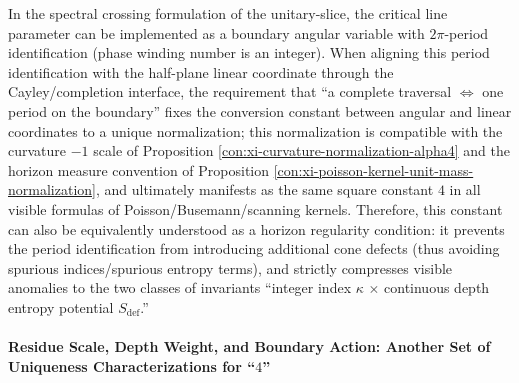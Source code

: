 \begin{proposition}\label{con:xi-four_as_horizon_regularization_no_cone}
In the spectral crossing formulation of the unitary-slice, the critical line parameter can be implemented as a boundary angular variable with \(2\pi\)-period identification (phase winding number is an integer).
When aligning this period identification with the half-plane linear coordinate through the Cayley/completion interface, the requirement that ``a complete traversal \(\Longleftrightarrow\) one period on the boundary'' fixes the conversion constant between angular and linear coordinates to a unique normalization; this normalization is compatible with the curvature \(-1\) scale of Proposition \ref{con:xi-curvature-normalization-alpha4} and the horizon measure convention of Proposition \ref{con:xi-poisson-kernel-unit-mass-normalization}, and ultimately manifests as the same square constant \(4\) in all visible formulas of Poisson/Busemann/scanning kernels.
Therefore, this constant can also be equivalently understood as a horizon regularity condition: it prevents the period identification from introducing additional cone defects (thus avoiding spurious indices/spurious entropy terms), and strictly compresses visible anomalies to the two classes of invariants ``integer index \(\kappa\) \(\times\) continuous depth entropy potential \(S_{\mathrm{def}}\).''
\end{proposition}

\paragraph{Residue Scale, Depth Weight, and Boundary Action: Another Set of Uniqueness Characterizations for ``\texorpdfstring{$4$}{4}''}

